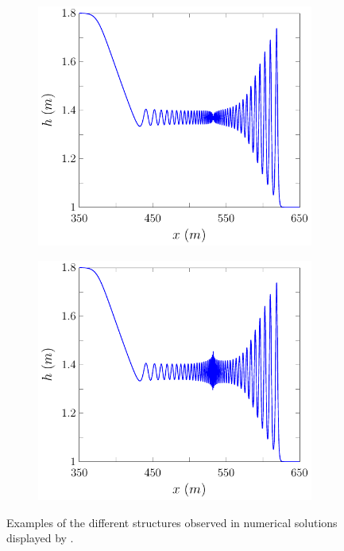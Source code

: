 \begin{figure}
\begin{subfigure}{0.5\textwidth}
		\vspace{0.5cm}
	\end{subfigure}
	\begin{subfigure}{0.5\textwidth}
		\includegraphics[width=\textwidth]{./chp2/figures/DamBreakStruct/9.pdf}
		\vspace{0.5cm}
	\end{subfigure}%
	\begin{subfigure}{0.5\textwidth}
		\includegraphics[width=\textwidth]{./chp2/figures/DamBreakStruct/20.pdf}
		\vspace{0.5cm}
	\end{subfigure}
	\caption{Examples of the different structures observed in numerical solutions displayed by \citet{Pitt-2018-61}.}
	\label{fig:DBExAll}
\end{figure}

